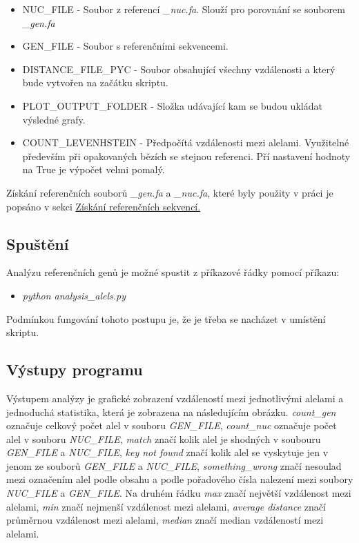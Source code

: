 \documentclass[czech,DP]{thesiskiv}
\numberwithin{equation}{section}
\begin{document}
\begin{itemize}
	\item NUC\_FILE - Soubor z referencí \textit{\_nuc.fa}. Slouží pro porovnání se souborem \textit{\_gen.fa}
	\item GEN\_FILE - Soubor s referenčními sekvencemi.
	\item DISTANCE\_FILE\_PYC - Soubor obsahující všechny vzdálenosti a který bude vytvořen na začátku skriptu.
	\item PLOT\_OUTPUT\_FOLDER - Složka udávající kam se budou ukládat výsledné grafy.
	\item COUNT\_LEVENHSTEIN - Předpočítá vzdálenosti mezi alelami. Využitelné především při opakovaných bězích se stejnou referenci. Pří nastavení hodnoty na True je výpočet velmi pomalý.
\end{itemize}

\noindent
Získání referenčních souborů \textit{\_gen.fa} a \textit{\_nuc.fa}, které byly použity v práci je popsáno v sekci  \hyperref[sec:ref_sek]{Získání referenčních sekvencí.}

\subsection{Spuštění}
Analýzu referenčních genů je možné spustit z příkazové řádky pomocí příkazu:
\begin{itemize}
 \item \colorbox{gray!15}{\textit{python analysis\_alels.py}}
\end{itemize}

\noindent
Podmínkou fungování tohoto postupu je, že je třeba se nacházet v umístění skriptu. 

\subsection{Výstupy programu}
Výstupem analýzy je grafické zobrazení vzdáleností mezi jednotlivými alelami a jednoduchá statistika, která je zobrazena na následujícím obrázku. \textit{count\_gen} označuje celkový počet alel v souboru \textit{GEN\_FILE}, \textit{count\_nuc} označuje počet alel v souboru \textit{NUC\_FILE}, \textit{match} značí kolik alel je shodných v soubouru \textit{GEN\_FILE} a \textit{NUC\_FILE}, \textit{key not found} značí kolik alel se vyskytuje jen v jenom ze souborů \textit{GEN\_FILE} a \textit{NUC\_FILE}, \textit{something\_wrong} značí nesoulad mezi označením alel podle obsahu a podle pořadového čísla nalezení mezi soubory \textit{NUC\_FILE} a \textit{GEN\_FILE}. Na druhém řádku \textit{max} značí největší vzdálenost mezi alelami, \textit{min} značí nejmenší vzdálenost mezi alelami, \textit{average distance} značí průměrnou vzdálenost mezi alelami, \textit{median} značí median vzdáleností mezi alelami.
\end{document}
